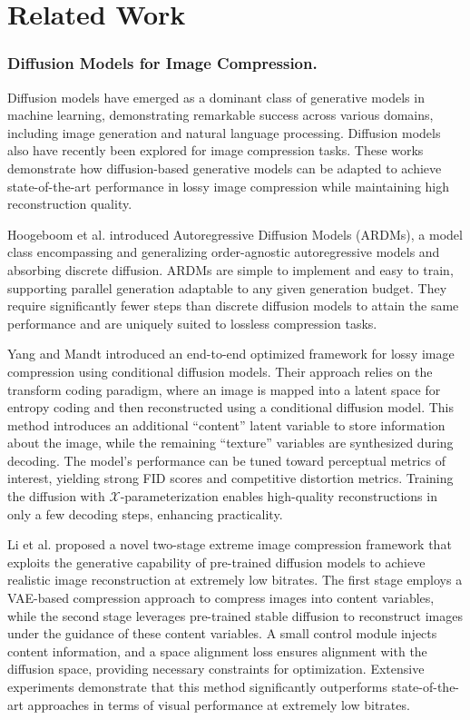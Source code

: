 \section{Related Work}

\subsubsection{Diffusion Models for Image Compression.}

Diffusion models \cite{Sohl2015,Song2019,Ho2020,Song2021scorebased,Nichol2021,Dhariwal2021} have emerged as a dominant class of generative models in machine learning, demonstrating remarkable success across various domains, including image generation and natural language processing. Diffusion models also have recently been explored for image compression tasks. These works demonstrate how diffusion-based generative models can be adapted to achieve state-of-the-art performance in lossy image compression while maintaining high reconstruction quality.

Hoogeboom et al. \cite{Hoogeboom2022autoregressive} introduced Autoregressive Diffusion Models (ARDMs), a model class encompassing and generalizing order-agnostic autoregressive models and absorbing discrete diffusion. ARDMs are simple to implement and easy to train, supporting parallel generation adaptable to any given generation budget. They require significantly fewer steps than discrete diffusion models to attain the same performance and are uniquely suited to lossless compression tasks. 

Yang and Mandt \cite{Yang2023cd} introduced an end-to-end optimized framework for lossy image compression using conditional diffusion models. Their approach relies on the transform coding paradigm, where an image is mapped into a latent space for entropy coding and then reconstructed using a conditional diffusion model. This method introduces an additional ``content'' latent variable to store information about the image, while the remaining ``texture'' variables are synthesized during decoding. The model's performance can be tuned toward perceptual metrics of interest, yielding strong FID scores and competitive distortion metrics. Training the diffusion with $\mathcal{X}$-parameterization enables high-quality reconstructions in only a few decoding steps, enhancing practicality.

Li et al. \cite{Li2024extreme} proposed a novel two-stage extreme image compression framework that exploits the generative capability of pre-trained diffusion models to achieve realistic image reconstruction at extremely low bitrates. The first stage employs a VAE-based compression approach to compress images into content variables, while the second stage leverages pre-trained stable diffusion to reconstruct images under the guidance of these content variables. A small control module injects content information, and a space alignment loss ensures alignment with the diffusion space, providing necessary constraints for optimization. Extensive experiments demonstrate that this method significantly outperforms state-of-the-art approaches in terms of visual performance at extremely low bitrates.

